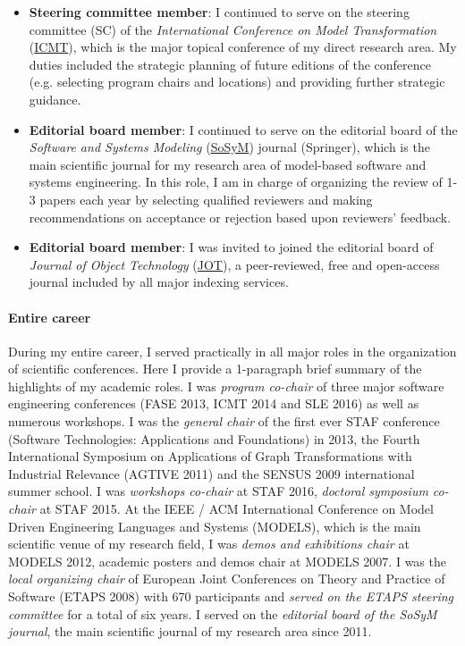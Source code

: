 \begin{itemize}
\item \textbf{Steering committee member}: I continued to serve on the steering committee (SC) of the \emph{International Conference on Model Transformation} (\href{http://www.model-transformation.org/}{ICMT}), which is the major topical conference of my direct research area. My duties included the strategic planning of future editions of the conference (e.g. selecting program chairs and locations) and providing further strategic guidance.

\item \textbf{Editorial board member}: I continued to serve on the editorial board of the \emph{Software and Systems Modeling} (\href{http://sosym.org/}{SoSyM}) journal (Springer), which is the main scientific journal for my research area of model-based software and systems engineering. In this role, I am in charge of organizing the review of 1-3 papers each year by selecting qualified reviewers and making recommendations on acceptance or rejection based upon reviewers' feedback.

\item \textbf{Editorial board member}: I was invited to joined the editorial board of \emph{Journal of Object Technology} (\href{http://www.jot.fm/}{JOT}),  a peer-reviewed, free and open-access journal included by all major indexing services. 
\end{itemize}

\paragraph{Entire career}
During my entire career, I served practically in all major roles in the organization of scientific conferences. Here I provide a 1-paragraph brief summary of the highlights of my academic roles. I was \emph{program co-chair} of three major software engineering conferences (FASE 2013, ICMT 2014 and SLE 2016) as well as numerous workshops. I was the \emph{general chair} of the first ever STAF conference (Software Technologies: Applications and Foundations) in 2013, the Fourth International Symposium on Applications of Graph Transformations with Industrial Relevance (AGTIVE 2011) and the SENSUS 2009 international summer school. I was \emph{workshops co-chair} at STAF 2016, \emph{doctoral symposium co-chair} at STAF 2015.
At the IEEE / ACM International Conference on Model Driven Engineering Languages and Systems (MODELS), which is the main scientific venue of my research field, I was \emph{demos and exhibitions chair} at MODELS 2012, academic posters and demos chair at MODELS 2007.  I was the \emph{local organizing chair} of European Joint Conferences on Theory and Practice of Software (ETAPS 2008) with 670 participants and \emph{served on the ETAPS steering committee} for a total of six years. 
I served on the \emph{editorial board of the SoSyM journal}, the main scientific journal of my research area since 2011.  

